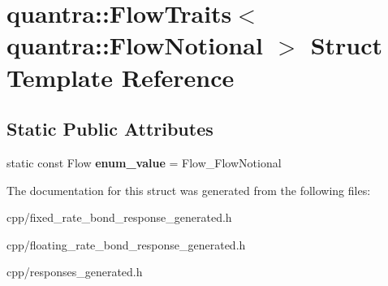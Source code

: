 \hypertarget{structquantra_1_1FlowTraits_3_01quantra_1_1FlowNotional_01_4}{}\section{quantra\+:\+:Flow\+Traits$<$ quantra\+:\+:Flow\+Notional $>$ Struct Template Reference}
\label{structquantra_1_1FlowTraits_3_01quantra_1_1FlowNotional_01_4}
\subsection*{Static Public Attributes}
\begin{DoxyCompactItemize}
\item 
\mbox{\label{structquantra_1_1FlowTraits_3_01quantra_1_1FlowNotional_01_4_ad0469aaca398c7f175e0fd3ae7af6a2b}} 
static const Flow {\bfseries enum\+\_\+value} = Flow\+\_\+\+Flow\+Notional
\end{DoxyCompactItemize}


The documentation for this struct was generated from the following files\+:\begin{DoxyCompactItemize}
\item 
cpp/fixed\+\_\+rate\+\_\+bond\+\_\+response\+\_\+generated.\+h\item 
cpp/floating\+\_\+rate\+\_\+bond\+\_\+response\+\_\+generated.\+h\item 
cpp/responses\+\_\+generated.\+h\end{DoxyCompactItemize}
